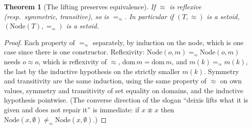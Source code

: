 \documentclass[11pt]{article}
\newtheorem{theorem}{Theorem}[section]
\theoremstyle{definition}
\newcommand{\NodeT}[1]{\mathrm{Node}(#1)}
\newcommand{\dom}{\mathrm{dom}\,}
\newcommand{\eqS}{=_{\approx}}                     %
\begin{document}
\begin{theorem}[The lifting preserves equivalence]\label{thm:equiv}
If $\approx$ is reflexive (resp.\ symmetric, transitive), so is $\eqS$. In particular
if $(T,\approx)$ is a setoid, $(\NodeT{T}, \eqS)$ is a setoid.
\end{theorem}

\begin{proof}
Each property of $\eqS$ separately, by induction on the node, which is one case since
there is one constructor. Reflexivity: $\mathrm{Node}(o, m) \eqS \mathrm{Node}(o, m)$
needs $o \approx o$, which is reflexivity of $\approx$,
$\dom m = \dom m$, and $m(k) \eqS m(k)$, the last by the inductive hypothesis on the
strictly smaller $m(k)$. Symmetry and transitivity are the same induction, using the
same property of $\approx$ on own values, symmetry and transitivity of set equality on
domains, and
the inductive hypothesis pointwise. (The converse direction of the slogan ``deixis lifts
what it is given and does not repair it'' is immediate: if $x \not\approx x$ then
$\mathrm{Node}(x, \emptyset) \not\eqS \mathrm{Node}(x, \emptyset)$.)
\end{proof}
\end{document}
